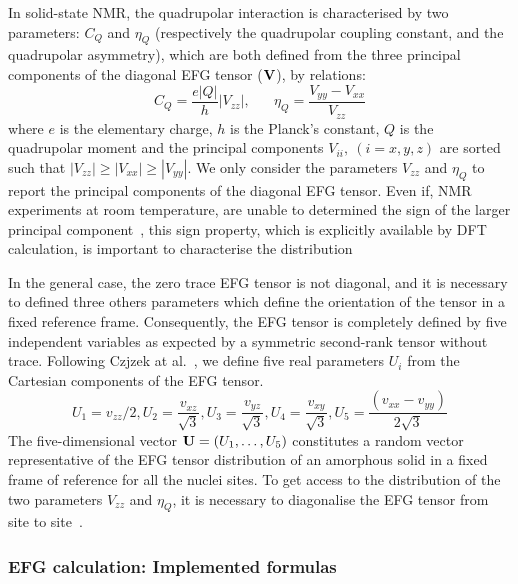 \documentclass[a4paper,8pt]{article}
\begin{document}
In solid-state NMR, the  quadrupolar interaction is  characterised by two parameters:
$C_Q$ and $\eta_Q$ (respectively the quadrupolar coupling constant, and  the
quadrupolar asymmetry), which are both defined from the  three principal  components
of the diagonal  EFG tensor  ($\bf{V}$), by relations:
\begin{equation}
  \label{eq:quad}
 C_Q=\frac{e|Q|}{h}|V_{zz}| ,\;\;\;\;\;\; \eta_Q=\frac{V_{yy}-V_{xx}}{V_{zz}}
\end{equation}
where $e$ is the elementary charge, $h$ is the Planck's constant, $Q$
is the quadrupolar  moment and the principal components $V_{ii},\ (i=x,y,z)$ are sorted
such that  $|V_{zz}|  \geqslant |V_{xx}| \geqslant |V_{yy}|$. 
We only consider the parameters $V_{zz}$ and $\eta_Q$ to report the principal
components of the diagonal EFG tensor. Even if, NMR experiments at room temperature, are unable
to determined the sign of the larger principal component~\cite{B-Abragam}, this sign property,
which is explicitly available by DFT calculation, is important to characterise the distribution~\cite{VasconcelosPRB}

In the general  case, the  zero trace  EFG tensor  is not
diagonal,  and it  is  necessary to  defined  three others  parameters
which  define the orientation  of the tensor in a fixed reference frame.
Consequently, the EFG tensor is completely defined by five independent
variables as expected by a symmetric second-rank tensor without trace.
Following Czjzek at al.~\cite{PRB.23.2513}, we define five real parameters
$U_i$ from the Cartesian components of the EFG tensor.
\begin{equation}
  \label{eq:U_i}
  U_1=v_{zz}/2, U_2=\frac{v_{xz}}{\sqrt{3}},U_3=\frac{v_{yz}}{\sqrt{3}},U_4=\frac{v_{xy}}{\sqrt{3}},U_5=\frac{(v_{xx}-v_{yy})}{2\sqrt{3}}  
\end{equation}
The five-dimensional vector ${\bf{U}}=(U_1,\ldots,U_5)$ constitutes a random vector
representative of the EFG tensor distribution of an amorphous solid in a fixed frame
of reference for all the nuclei sites. To get access to the distribution of the two
parameters $V_{zz}$ and $\eta_Q$, it is necessary to diagonalise the EFG tensor from
site to site~\cite{JPCM.10.10715}.


\subsubsection{EFG calculation: Implemented formulas}
\end{document}
